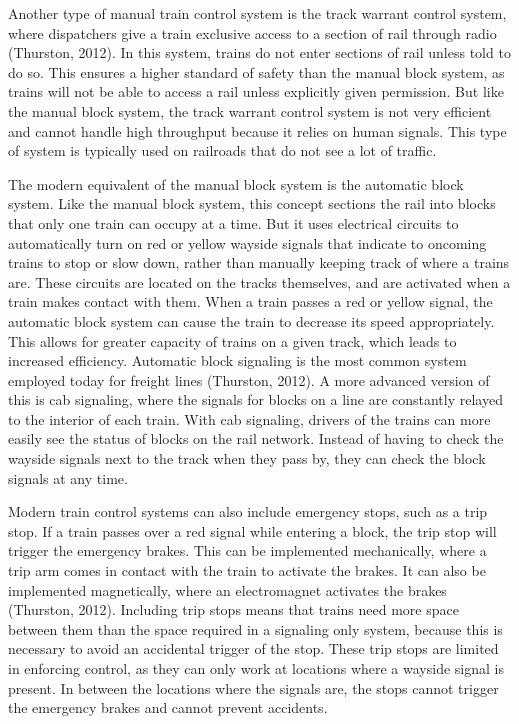 \documentclass[11pt, titlepage]{article}
\begin{document}
Another type of manual train control system is the track warrant control system, where dispatchers give a train exclusive access to a section of rail through radio (Thurston, 2012). In this system, trains do not enter sections of rail unless told to do so. This ensures a higher standard of safety than the manual block system, as trains will not be able to access a rail unless explicitly given permission. But like the manual block system, the track warrant control system is not very efficient and cannot handle high throughput because it relies on human signals. This type of system is typically used on railroads that do not see a lot of traffic.

The modern equivalent of the manual block system is the automatic block system. Like the manual block system, this concept sections the rail into blocks that only one train can occupy at a time. But it uses electrical circuits to automatically turn on red or yellow wayside signals that indicate to oncoming trains to stop or slow down, rather than manually keeping track of where a trains are. These circuits are located on the tracks themselves, and are activated when a train makes contact with them. When a train passes a red or yellow signal, the automatic block system can cause the train to decrease its speed appropriately. This allows for greater capacity of trains on a given track, which leads to increased efficiency. Automatic block signaling is the most common system employed today for freight lines (Thurston, 2012). A more advanced version of this is cab signaling, where the signals for blocks on a line are constantly relayed to the interior of each train. With cab signaling, drivers of the trains can more easily see the status of blocks on the rail network. Instead of having to check the wayside signals next to the track when they pass by, they can check the block signals at any time.

Modern train control systems can also include emergency stops, such as a trip stop. If a train passes over a red signal while entering a block, the trip stop will trigger the emergency brakes. This can be implemented mechanically, where a trip arm comes in contact with the train to activate the brakes. It can also be implemented magnetically, where an electromagnet activates the brakes (Thurston, 2012). Including trip stops means that trains need more space between them than the space required in a signaling only system, because this is necessary to avoid an accidental trigger of the stop. These trip stops are limited in enforcing control, as they can only work at locations where a wayside signal is present. In between the locations where the signals are, the stops cannot trigger the emergency brakes and cannot prevent accidents.
\end{document}
